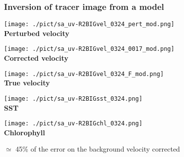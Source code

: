 \documentclass[compress,slidescentered,notes=hide]{beamer}
\begin{document}
\begin{frame}
  \frametitle{Inversion of tracer image from a model}
\begin{minipage}{0.3\textwidth}
\begin{center}
\texttt{[image: ./pict/sa\_uv-R2BIGvel\_0324\_pert\_mod.png]}\\
{\small \bf Perturbed velocity}
\end{center}
\end{minipage}
\begin{minipage}{0.3\textwidth}
\begin{center}
\texttt{[image: ./pict/sa\_uv-R2BIGvel\_0324\_0017\_mod.png]}\\
{\small \bf Corrected velocity}
\end{center}
\end{minipage}
\begin{minipage}{0.3\textwidth}
\begin{center}
\texttt{[image: ./pict/sa\_uv-R2BIGvel\_0324\_F\_mod.png]}\\

{\small \bf True velocity}
\end{center}
\end{minipage}
\begin{minipage}{0.34\textwidth}
\begin{center}
\texttt{[image: ./pict/sa\_uv-R2BIGsst\_0324.png]}\\
{\small \bf SST}
\end{center}
\end{minipage}
\begin{minipage}{0.34\textwidth}
\begin{center}
\texttt{[image: ./pict/sa\_uv-R2BIGchl\_0324.png]}\\
{\small \bf Chlorophyll}
\end{center}
\end{minipage}
\begin{minipage}{0.3\textwidth}
\begin{block}{}
$\simeq$ 45\% of the error on the background velocity corrected
\end{block}
\end{minipage}

\end{frame}
\end{document}

